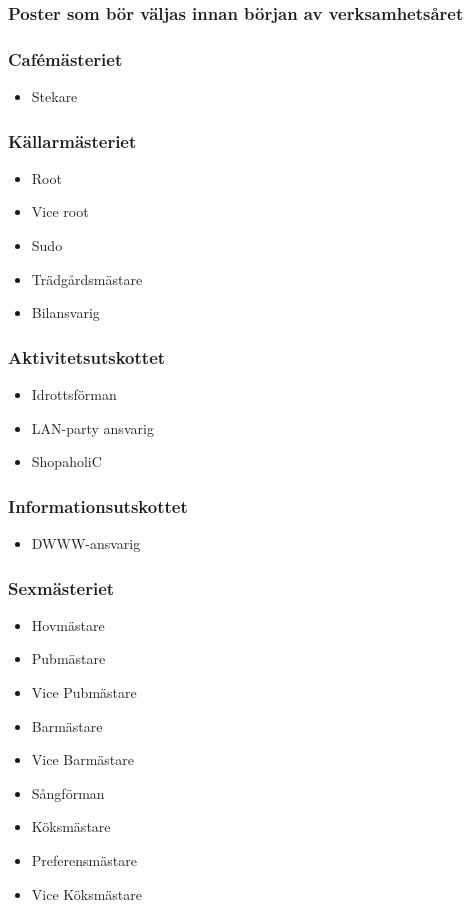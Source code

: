 \documentclass{dsekprotokoll}
\begin{document}
\subsubsection*{Poster som bör väljas innan början av verksamhetsåret}
\begin{multicols}{2}

    \subsubsection*{Cafémästeriet}
    \begin{itemize}
        \item Stekare
    \end{itemize}

    \subsubsection*{Källarmästeriet}
    \begin{itemize}
        \item Root
        \item Vice root
        \item Sudo
        \item Trädgårdsmästare
        \item Bilansvarig
    \end{itemize}

    \subsubsection*{Aktivitetsutskottet}
    \begin{itemize}
        \item Idrottsförman
        \item LAN-party ansvarig
        \item ShopaholiC
    \end{itemize}

    \subsubsection*{Informationsutskottet}
    \begin{itemize}
        \item DWWW-ansvarig
    \end{itemize}

    \subsubsection*{Sexmästeriet}
    \begin{itemize}
        \item Hovmästare
        \item Pubmästare
        \item Vice Pubmästare
        \item Barmästare
        \item Vice Barmästare
        \item Sångförman
        \item Köksmästare
        \item Preferensmästare
        \item Vice Köksmästare
    \end{itemize}


\end{multicols}
\end{document}
